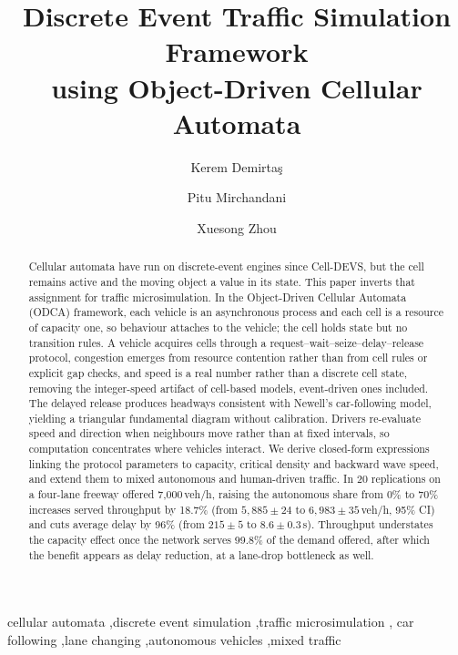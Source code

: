 \documentclass[review,number]{elsarticle}
\begin{document}
\begin{frontmatter}

\title{Discrete Event Traffic Simulation Framework\\using Object-Driven Cellular Automata}

\author[asu]{Kerem Demirta\c{s}}
\author[asu]{Pitu Mirchandani}
\author[ssebe]{Xuesong Zhou}


\begin{abstract}
Cellular automata have run on discrete-event engines since Cell-DEVS, but the cell remains active and the moving object a value in its state. This paper inverts that assignment for traffic microsimulation. In the Object-Driven Cellular Automata (ODCA) framework, each vehicle is an asynchronous process and each cell is a resource of capacity one, so behaviour attaches to the vehicle; the cell holds state but no transition rules. A vehicle acquires cells through a request--wait--seize--delay--release protocol, congestion emerges from resource contention rather than from cell rules or explicit gap checks, and speed is a real number rather than a discrete cell state, removing the integer-speed artifact of cell-based models, event-driven ones included. The delayed release produces headways consistent with Newell's car-following model, yielding a triangular fundamental diagram without calibration. Drivers re-evaluate speed and direction when neighbours move rather than at fixed intervals, so computation concentrates where vehicles interact. We derive closed-form expressions linking the protocol parameters to capacity, critical density and backward wave speed, and extend them to mixed autonomous and human-driven traffic. In 20 replications on a four-lane freeway offered 7{,}000\,veh/h, raising the autonomous share from 0\% to 70\% increases served throughput by 18.7\% (from $5{,}885 \pm 24$ to $6{,}983 \pm 35$\,veh/h, 95\% CI) and cuts average delay by 96\% (from $215 \pm 5$ to $8.6 \pm 0.3$\,s). Throughput understates the capacity effect once the network serves 99.8\% of the demand offered, after which the benefit appears as delay reduction, at a lane-drop bottleneck as well.
\end{abstract}

\begin{keyword}
cellular automata \sep discrete event simulation \sep traffic microsimulation \sep
car following \sep lane changing \sep autonomous vehicles \sep mixed traffic
\end{keyword}

\end{frontmatter}
\end{document}
